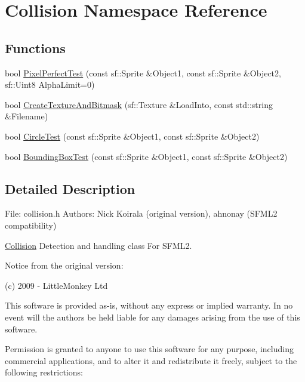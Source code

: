 \hypertarget{namespace_collision}{}\section{Collision Namespace Reference}
\label{namespace_collision}
\subsection*{Functions}
\begin{DoxyCompactItemize}
\item 
bool \mbox{\hyperlink{namespace_collision_a5514da2189b7230dd266ac6ada2fcc5b}{Pixel\+Perfect\+Test}} (const sf\+::\+Sprite \&Object1, const sf\+::\+Sprite \&Object2, sf\+::\+Uint8 Alpha\+Limit=0)
\item 
bool \mbox{\hyperlink{namespace_collision_a22b8e23d7fc5cb243d4365d1c179cf39}{Create\+Texture\+And\+Bitmask}} (sf\+::\+Texture \&Load\+Into, const std\+::string \&Filename)
\item 
bool \mbox{\hyperlink{namespace_collision_af2f8835beee81b76d04311c794c36c0f}{Circle\+Test}} (const sf\+::\+Sprite \&Object1, const sf\+::\+Sprite \&Object2)
\item 
bool \mbox{\hyperlink{namespace_collision_a6f5945d467e629017010b139062919c6}{Bounding\+Box\+Test}} (const sf\+::\+Sprite \&Object1, const sf\+::\+Sprite \&Object2)
\end{DoxyCompactItemize}


\subsection{Detailed Description}
File\+: collision.\+h Authors\+: Nick Koirala (original version), ahnonay (S\+F\+M\+L2 compatibility)

\mbox{\hyperlink{namespace_collision}{Collision}} Detection and handling class For S\+F\+M\+L2.

Notice from the original version\+:

(c) 2009 -\/ Little\+Monkey Ltd

This software is provided \textquotesingle{}as-\/is\textquotesingle{}, without any express or implied warranty. In no event will the authors be held liable for any damages arising from the use of this software.

Permission is granted to anyone to use this software for any purpose, including commercial applications, and to alter it and redistribute it freely, subject to the following restrictions\+:


